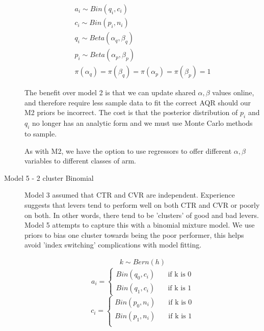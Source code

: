 \documentclass[11pt,a4,singlespacing,titlepagenumber=on]{scrreprt}
\numberwithin{equation}{chapter} %
\theoremstyle{remark}
\begin{document}
\begin{description}
  \begin{align}
	a_i \sim Bin(q_i,c_i) \\
	c_i \sim Bin(p_i,n_i) \\
	q_i \sim Beta(\alpha_q,\beta_q) \\
	p_i \sim Beta(\alpha_p,\beta_p) \\
	\pi(\alpha_q) = \pi(\beta_q) = \pi(\alpha_p) = \pi(\beta_p) = 1
  \end{align}

The benefit over model 2 is that we can update shared $\alpha, \beta$ values online, and therefore require less sample data to fit the correct AQR should our M2 priors be incorrect. The cost is that the posterior distribution of $p_i$ and $q_i$ no longer has an analytic form and we must use Monte Carlo methods to sample.

As with M2, we have the option to use regressors to offer different $\alpha, \beta$ variables to different classes of arm.


	\item[Model 5 - 2 cluster Binomial]

Model 3 assumed that CTR and CVR are independent. Experience suggests that levers tend to perform well on both CTR and CVR or poorly on both. In other words, there tend to be 'clusters' of good and bad levers. Model 5 attempts to capture this with a binomial mixture model. We use priors to bias one cluster towards being the poor performer, this helps avoid 'index switching' complications with model fitting. 
 
 \begin{align}
	k \sim Bern(h) 
\end{align}
	\[ 
	a_i = 
  	\begin{cases}
		Bin(q_0,c_i) & \quad \text{if k is 0}\\
		Bin(q_1,c_i) & \quad \text{if k is 1}
	\end{cases}
	\]
	\[
	c_i = 
  	\begin{cases}
		Bin(p_0,n_i) & \quad \text{if k is 0}\\
		Bin(p_1,n_i) & \quad \text{if k is 1}\\
	\end{cases}
	\]


\end{description}
\end{document}
